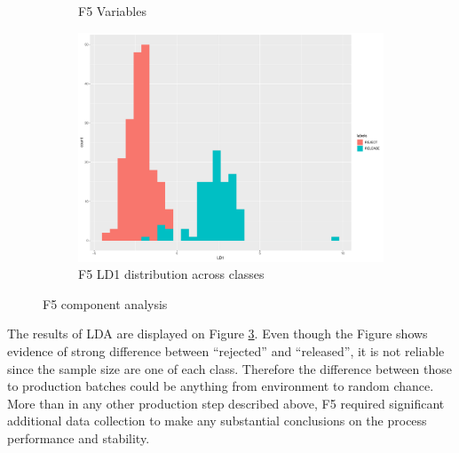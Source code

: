 \begin{figure}[ht!]
\begin{subfigure}{.3\textwidth}
        \caption{F5 Variables}
        \label{fig:f5_variables}
    \end{subfigure}%
    \begin{subfigure}{0.3\textwidth}
        \begin{center}
        \includegraphics[width=\textwidth]{plots/f5_LD1.pdf}
        \end{center}
        \caption{F5 LD1 distribution across classes}
        \label{fig:f5_LD1}
    \end{subfigure}
    \caption{F5 component analysis}
\end{figure}

The results of LDA are displayed on Figure \ref{fig:f5_LD1}. Even though the Figure shows evidence of strong difference between ``rejected'' and ``released'', it is not reliable since the sample size are one of each class. Therefore the difference between those to production batches could be anything from environment to random chance. More than in any other production step described above, F5 required significant additional data collection to make any substantial conclusions on the process performance and stability.

